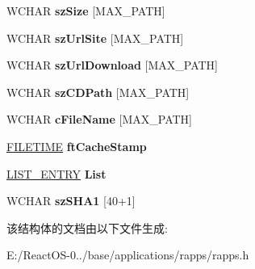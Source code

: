 \begin{DoxyCompactItemize}
W\+C\+H\+AR {\bfseries sz\+Size} \mbox{[}M\+A\+X\+\_\+\+P\+A\+TH\mbox{]}
\item 
\mbox{\label{struct_a_p_p_l_i_c_a_t_i_o_n___i_n_f_o_afed01adb3a9c8c1c10bf9078041c7c66}} 
W\+C\+H\+AR {\bfseries sz\+Url\+Site} \mbox{[}M\+A\+X\+\_\+\+P\+A\+TH\mbox{]}
\item 
\mbox{\label{struct_a_p_p_l_i_c_a_t_i_o_n___i_n_f_o_a8ed536958439bbdfdea889669882acf1}} 
W\+C\+H\+AR {\bfseries sz\+Url\+Download} \mbox{[}M\+A\+X\+\_\+\+P\+A\+TH\mbox{]}
\item 
\mbox{\label{struct_a_p_p_l_i_c_a_t_i_o_n___i_n_f_o_a2e8e4b33fb6978b192c6704ef892ae01}} 
W\+C\+H\+AR {\bfseries sz\+C\+D\+Path} \mbox{[}M\+A\+X\+\_\+\+P\+A\+TH\mbox{]}
\item 
\mbox{\label{struct_a_p_p_l_i_c_a_t_i_o_n___i_n_f_o_abfa2c2bdb999aa372c58a88500361c78}} 
W\+C\+H\+AR {\bfseries c\+File\+Name} \mbox{[}M\+A\+X\+\_\+\+P\+A\+TH\mbox{]}
\item 
\mbox{\label{struct_a_p_p_l_i_c_a_t_i_o_n___i_n_f_o_ad00ff67d8c219a8aba802fa68e71262a}} 
\hyperlink{struct___f_i_l_e_t_i_m_e}{F\+I\+L\+E\+T\+I\+ME} {\bfseries ft\+Cache\+Stamp}
\item 
\mbox{\label{struct_a_p_p_l_i_c_a_t_i_o_n___i_n_f_o_a03bb9030d0c1ffab5aaa225868c679be}} 
\hyperlink{struct___l_i_s_t___e_n_t_r_y}{L\+I\+S\+T\+\_\+\+E\+N\+T\+RY} {\bfseries List}
\item 
\mbox{\label{struct_a_p_p_l_i_c_a_t_i_o_n___i_n_f_o_a3da7cf177e0ede7a7211fede3be4275e}} 
W\+C\+H\+AR {\bfseries sz\+S\+H\+A1} \mbox{[}40+1\mbox{]}
\end{DoxyCompactItemize}


该结构体的文档由以下文件生成\+:\begin{DoxyCompactItemize}
\item 
E\+:/\+React\+O\+S-\/0../base/applications/rapps/rapps.\+h\end{DoxyCompactItemize}
